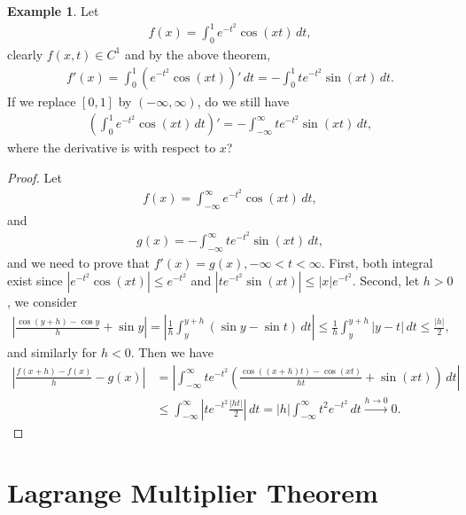 \documentclass[11pt]{book}
\theoremstyle{definition}
\newtheorem{example}{Example}[chapter]
\numberwithin{equation}{chapter}
\begin{document}
\begin{example}
Let 
\begin{align*}
    f(x) = \int^1_0 e^{-t^2} \cos(xt) \,dt,
\end{align*}
clearly $f(x,t) \in C^1$ and by the above theorem, 
\begin{align*}
    f'(x) = \int^1_0 \left(e^{-t^2} \cos(xt)\right)' \,dt = - \int^1_0 t e^{-t^2} \sin(xt) \,dt.
\end{align*}
If we replace $[0,1]$ by $(-\infty, \infty)$, do we still have
\begin{align*}
    \left(\int^1_0 e^{-t^2} \cos(xt) \,dt\right)' = - \int^{\infty}_{-\infty} t e^{-t^2} \sin(xt) \,dt,
\end{align*}
where the derivative is with respect to $x$?
\end{example}
\begin{proof}
Let
\begin{align}
    f(x) = \int^{\infty}_{-\infty} e^{-t^2} \cos(xt) \,dt, 
\end{align}
and
\begin{align}
    g(x) = - \int^{\infty}_{-\infty} t e^{-t^2} \sin(xt) \,dt,
\end{align}
and we need to prove that $f'(x) = g(x), - \infty < t < \infty$. First, both integral exist since $\left|e^{-t^2} \cos(xt)\right| \leq e^{-t^2}$ and $\left|t e^{-t^2} \sin(xt)\right| \leq \left|x\right| e^{-t^2}$. Second, let $h > 0$, we consider
\begin{align*}
    \left|\frac{\cos(y+h) - \cos y}{h} + \sin y \right| = \left|\frac{1}{h} \int^{y+h}_{y} (\sin y - \sin t) \,dt \right| \leq \frac{1}{h} \int^{y+h}_{y} \left|y - t\right| \,dt \leq \frac{\left|h\right|}{2},
\end{align*}
and similarly for $h < 0$. Then we have
\begin{align*}
    \left|\frac{f(x+h) - f(x)}{h} - g(x)\right| & = \left|\int^{\infty}_{-\infty} t e^{-t^2} \left(\frac{\cos((x+h)t) - \cos(xt)}{ht} + \sin(xt) \right) \,dt\right| \\
    & \leq \int^{\infty}_{-\infty} \left| t e^{-t^2} \frac{\left|ht\right|}{2} \right| \,dt = \left|h\right| \int^{\infty}_{-\infty} t^2 e^{-t^2} \,dt \xrightarrow[]{h \to 0} 0.
\end{align*}
\end{proof}


\medskip




\section{Lagrange Multiplier Theorem}
\end{document}
